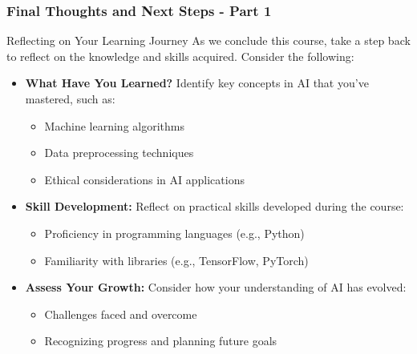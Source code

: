 \documentclass[aspectratio=169]{beamer}
\begin{document}
\begin{frame}[fragile]
    \frametitle{Final Thoughts and Next Steps - Part 1}
    \begin{block}{Reflecting on Your Learning Journey}
        As we conclude this course, take a step back to reflect on the knowledge and skills acquired. Consider the following:
    \end{block}
    \begin{itemize}
        \item \textbf{What Have You Learned?}  
            Identify key concepts in AI that you've mastered, such as:
            \begin{itemize}
                \item Machine learning algorithms
                \item Data preprocessing techniques
                \item Ethical considerations in AI applications
            \end{itemize}

        \item \textbf{Skill Development:}  
            Reflect on practical skills developed during the course:
            \begin{itemize}
                \item Proficiency in programming languages (e.g., Python)
                \item Familiarity with libraries (e.g., TensorFlow, PyTorch)
            \end{itemize}

        \item \textbf{Assess Your Growth:}  
            Consider how your understanding of AI has evolved:
            \begin{itemize}
                \item Challenges faced and overcome
                \item Recognizing progress and planning future goals
            \end{itemize}
    \end{itemize}
\end{frame}
\end{document}
